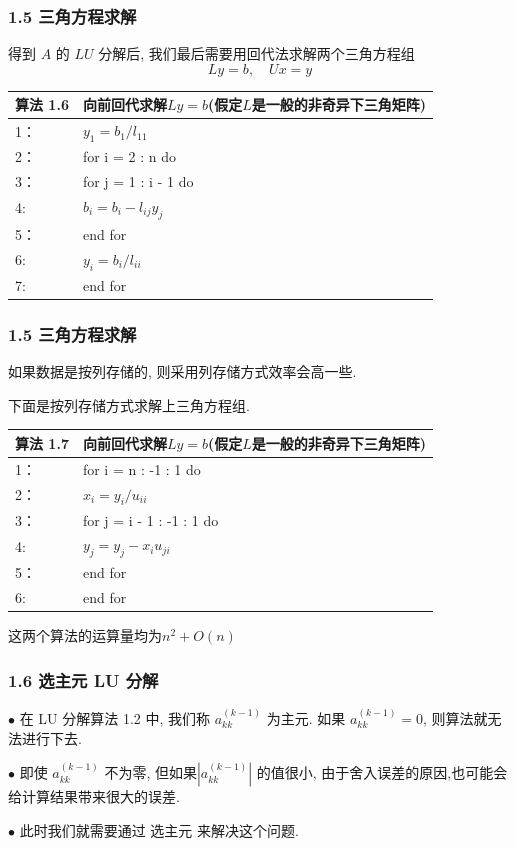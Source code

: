 \documentclass[notheorems,serif]{beamer}
\begin{document}
\begin{frame}
\frametitle{1.5 \quad 三角方程求解}
得到 $A$ 的 $LU$ 分解后, 我们最后需要用回代法求解两个三角方程组
$$L y=b, \quad U x=y$$

\begin{table}  
	\begin{tabular*}{16cm}{ll}  
		\hline  
		算法 1.6 &向前回代求解$Ly =b$(假定$L$是一般的非奇异下三角矩阵)\\  
		\hline  
		1：   &$y_{1}=b_{1} / l_{11}$\\  
		2：   & for i = 2 : n do\\
		3：   & \qquad for j = 1 : i - 1 do\\
		4:    & \qquad \qquad$b_{i}=b_{i}-l_{i j} y_{j}$\\
		5：   & \qquad end for\\
		6:    & \qquad $y_{i}=b_{i} / l_{i i}$\\
		7:    & end for\\
		\hline  
	\end{tabular*}  
\end{table}
\end{frame}

\begin{frame}
\frametitle{1.5 \quad 三角方程求解}
如果数据是按列存储的, 则采用列存储方式效率会高一些.

下面是按列存储方式求解上三角方程组.

\begin{table}  
	\begin{tabular*}{16cm}{ll}  
		\hline  
		算法 1.7 &向前回代求解$Ly =b$(假定$L$是一般的非奇异下三角矩阵)\\  
		\hline  
		1：   & for i = n : -1 : 1 do\\  
		2：   & \qquad $x_{i}=y_{i} / u_{i i}$\\
		3：   & \qquad for j = i - 1 : -1 : 1 do\\
		4:    & \qquad \qquad$y_{j}=y_{j}-x_{i} u_{j i}$\\
		5：   & \qquad end for\\
		6:    & end for\\
		\hline  
	\end{tabular*}  
\end{table}

这两个算法的运算量均为$n^2+O(n)$
\end{frame}

\begin{frame}
\frametitle{1.6 \quad 选主元 LU 分解}

$\bullet$ 在 LU 分解算法 1.2 中, 我们称 $a_{k k}^{(k-1)}$ 为主元. 如果 $a_{k k}^{(k-1)}=0$, 则算法就无法进行下去.

$\bullet$ 即使 $a_{k k}^{(k-1)}$ 不为零, 但如果$\left|a_{k k}^{(k-1)}\right|$ 的值很小, 由于舍入误差的原因,也可能会给计算结果带来很大的误差.

$\bullet$ 此时我们就需要通过 选主元 来解决这个问题.

\end{frame}
\end{document}
